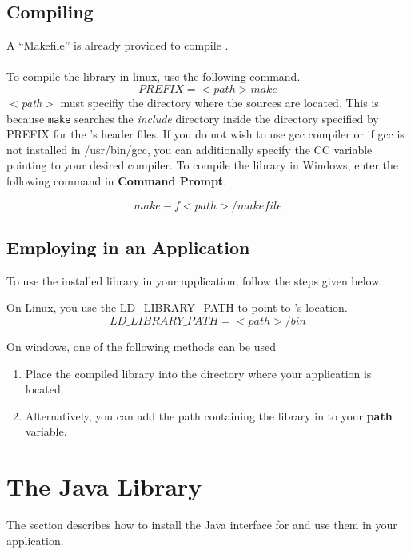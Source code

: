 \subsection*{Compiling \libalf}
A ``Makefile'' is already provided to compile \libalf.
\paragraph{}
To compile the library in linux, use the following command.
\[
  PREFIX = <path> make
\]
\emph{$<$path$>$} must specifiy the directory where the \libalf sources are located. This is because \texttt{make} searches the \emph{include} directory inside the directory specified by PREFIX for the \libalf's header files. If you do not wish to use gcc compiler or if gcc is not installed in /usr/bin/gcc, you can additionally specify the CC variable pointing to your desired \cpp compiler. \vskip 1pt
\reversemarginpar
{} To compile the library in Windows, enter the following command in \textbf{Command Prompt}.

\[
 make -f <path>/makefile
\]
\subsection*{Employing \libalf in an Application}
To use the installed library in your application, follow the steps given below. \vskip 1pt

On Linux, you use the LD\_LIBRARY\_PATH to point to \libalf's location.
\[
  LD\_LIBRARY\_PATH = <path>/bin
\]

On windows, one of the following methods can be used 
\begin{enumerate}
 \item Place the compiled library into the directory where your application is located.
 \item Alternatively, you can add the path containing the \libalf library in to your \textbf{path} variable.
\end{enumerate}

\section{The \jalf Java Library}
The section describes how to install the Java interface for \libalf and use them in your application.
